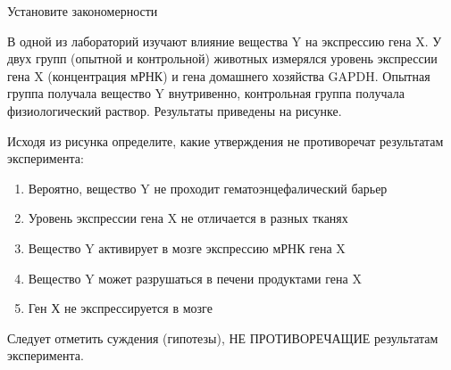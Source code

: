 
Установите закономерности

В одной из лабораторий изучают влияние вещества Y на экспрессию гена X. У двух групп (опытной и
контрольной) животных измерялся уровень экспрессии гена X (концентрация мРНК) и гена домашнего
хозяйства GAPDH. Опытная группа получала вещество Y внутривенно, контрольная группа
получала физиологический раствор. Результаты приведены на рисунке.


Исходя из
рисунка определите, какие утверждения не противоречат результатам эксперимента:

\begin{enumerate}
    \item Вероятно, вещество Y не проходит гематоэнцефалический барьер
    \item Уровень экспрессии гена X не отличается в разных тканях
    \item Вещество Y активирует в мозге экспрессию мРНК гена X
    \item Вещество Y может разрушаться в печени продуктами гена X
    \item Ген Х не экспрессируется в мозге
\end{enumerate}


\explanationSection

Следует отметить суждения (гипотезы), НЕ ПРОТИВОРЕЧАЩИЕ результатам эксперимента.

